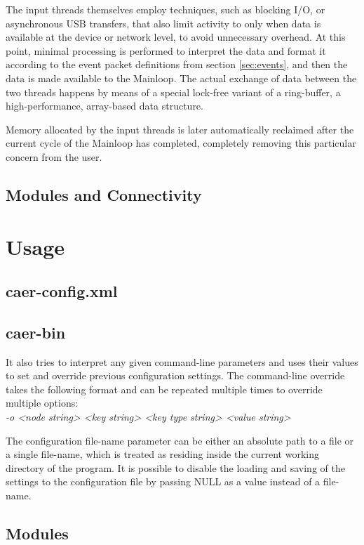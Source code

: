 \documentclass[a4paper,12pt]{report}
\begin{document}
The input threads themselves employ techniques, such as blocking I/O, or asynchronous USB transfers, that also limit activity to only when data is available at the device or network level, to avoid unnecessary overhead. At this point, minimal processing is performed to interpret the data and format it according to the event packet definitions from section \ref{sec:events}, and then the data is made available to the Mainloop.
The actual exchange of data between the two threads happens by means of a special lock-free variant of a ring-buffer, a high-performance, array-based data structure.

Memory allocated by the input threads is later automatically reclaimed after the current cycle of the Mainloop has completed, completely removing this particular concern from the user.

\section{Modules and Connectivity} \label{sec:modules_and_connectivity}

\chapter{Usage} \label{chap:usage}

\section{caer-config.xml}

\section{caer-bin}

It also tries to interpret any given command-line parameters and uses their values to set and override previous configuration settings.
The command-line override takes the following format and can be repeated multiple times to override multiple options:
\\\emph{-o <node string> <key string> <key type string> <value string>}

The configuration file-name parameter can be either an absolute path to a file or a single file-name, which is treated as residing inside the current working directory of the program.
It is possible to disable the loading and saving of the settings to the configuration file by passing NULL as a value instead of a file-name.

\section{Modules}
\end{document}

